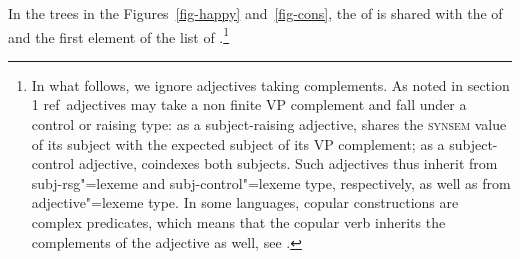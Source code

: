 \documentclass[output=paper
	        ,collection
	        ,collectionchapter
 	        ,biblatex
                ,babelshorthands
                ,newtxmath
                ,draftmode
                ,colorlinks, citecolor=brown
]{langscibook}
\begin{document}
In the trees in the Figures~\ref{fig-happy} and~\ref{fig-cons}, the \subjf of  is
shared with the \subjf of  and the first element of the \comps list of
.\footnote{In what follows, we ignore adjectives taking complements. As noted in section 1 ref\, adjectives may take a non finite VP complement and fall under a control or raising type: as a subject-raising adjective,  shares the \textsc{synsem} value of its subject with the expected subject of its VP complement; as a subject-control adjective,  coindexes both subjects.
Such adjectives thus inherit from subj-rsg"=lexeme and subj-control"=lexeme type, respectively, as well as from adjective"=lexeme type. In some languages, copular constructions are complex predicates, which means that the copular verb inherits the complements of the adjective as well, see .}
\end{document}
